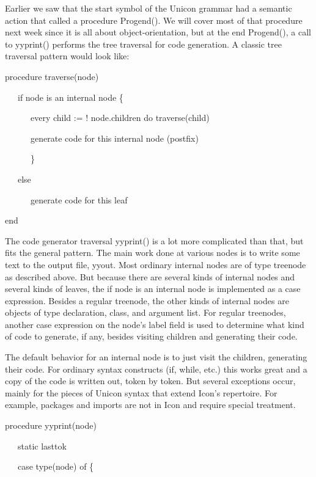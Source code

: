 Earlier we saw that the start symbol of the Unicon grammar had a
semantic action that called a procedure Progend(). We will cover most
of that procedure next week since it is all about object-orientation,
but at the end Progend(), a call to yyprint() performs the tree
traversal for code generation. A classic tree traversal pattern would
look like:

{\ttfamily\mdseries
procedure traverse(node)}

{\ttfamily\mdseries
\ \ \ if node is an internal node \{}

{\ttfamily\mdseries
\ \ \ \ \ \ every child := ! node.children do traverse(child)}

{\ttfamily\mdseries
\ \ \ \ \ \ generate code for this internal node (postfix)}

{\ttfamily\mdseries
\ \ \ \ \ \ \}}

{\ttfamily\mdseries
\ \ \ else}

{\ttfamily\mdseries
\ \ \ \ \ \ generate code for this leaf}

{\ttfamily\mdseries
end}

The code generator traversal yyprint() is a lot more complicated than
that, but fits the general pattern. The main work done at various
nodes is to write some text to the output file, yyout. Most ordinary
internal nodes are of type treenode as described above. But because
there are several kinds of internal nodes and several kinds of leaves,
the {\textquotedbl}if node is an internal node{\textquotedbl} is
implemented as a case expression. Besides a regular treenode, the
other kinds of internal nodes are objects of type declaration, class,
and argument list. For regular treenodes, another case expression on
the node's label field is used to determine what kind of code to
generate, if any, besides visiting children and generating their code.

The default behavior for an internal node is to just visit the
children, generating their code. For ordinary syntax constructs (if,
while, etc.) this works great and a copy of the code is written out,
token by token. But several exceptions occur, mainly for the pieces of
Unicon syntax that extend Icon's repertoire. For example, packages and
imports are not in Icon and require special treatment.

{\ttfamily\mdseries
procedure yyprint(node)}

{\ttfamily\mdseries
\ \ \ static lasttok}

{\ttfamily\mdseries
\ \ \ case type(node) of \{}

